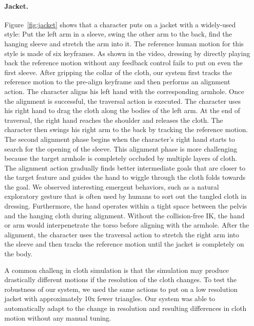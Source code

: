 \paragraph{Jacket.} Figure~\ref{fig:jacket} shows that a character puts on a jacket with a widely-used style: Put the left arm in a sleeve, swing the other arm to the back, find the hanging sleeve and stretch the arm into it. The reference human motion for this style is made of six keyframes. As shown in the video, dressing by directly playing back the reference motion without any feedback control fails to put on even the first sleeve. After gripping the collar of the cloth, our system first tracks the reference motion to the pre-align keyframe and then performs an alignment action. The character aligns his left hand with the corresponding armhole. Once the alignment is successful, the traversal action is executed. The character uses his right hand to drag the cloth along the bodies of the left arm. At the end of traversal, the right hand reaches the shoulder and releases the cloth. The character then swings his right arm to the back by tracking the reference motion. The second alignment phase begins when the character's right hand starts to search for the opening of the sleeve. This alignment phase is more challenging because the target armhole is completely occluded by multiple layers of cloth. The alignment action gradually finds better intermediate goals that are closer to the target feature and guides the hand to wiggle through the cloth folds towards the goal. We observed interesting emergent behaviors, such as a natural exploratory gesture that is often used by humans to sort out the tangled cloth in dressing. Furthermore, the hand operates within a tight space between the pelvis and the hanging cloth during alignment. Without the collision-free IK, the hand or arm would interpenetrate the torso before aligning with the armhole. After the alignment, the character uses the traversal action to stretch the right arm into the sleeve and then tracks the reference motion until the jacket is completely on the body. 

A common challeng in cloth simulation is that the simulation may produce drastically different motions if the resolution of the cloth changes. To test the robustness of our system, we used the same actions to put on a low resolution jacket with approximately 10x fewer triangles. Our system was able to automatically adapt to the change in resolution and resulting differences in cloth motion without any manual tuning.

